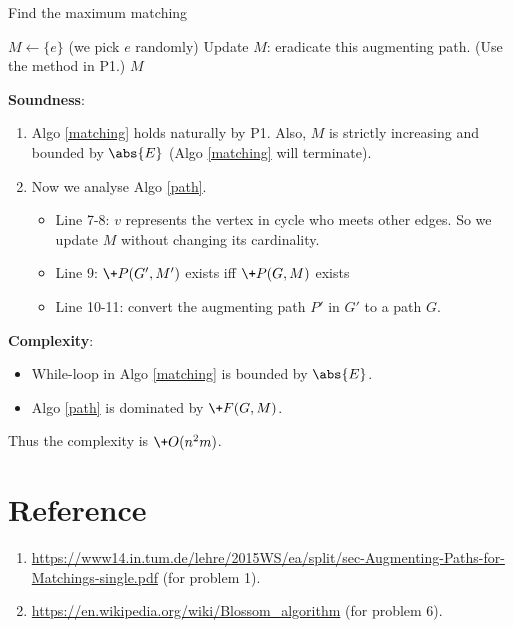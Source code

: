 \documentclass{article}
\begin{document}
\begin{algorithm}[H]
	\caption{Find the maximum matching}
	\label{matching}
	\begin{algorithmic}[1]
		\renewcommand{\algorithmicrequire}{\textbf{Input:}}
		\renewcommand{\algorithmicensure}{\textbf{Output:}}
		\renewcommand{\algorithmiccomment}[1]{\hfill\textit{\textcolor{blue}{\##1}}}
		\REQUIRE 
		\ENSURE 
		\STATE $M\gets \{e\}$ (we pick $e$ randomly)
		\STATE Update $M$: eradicate this augmenting path. (Use the method in P1.)
		\ENDWHILE
		\RETURN $M$
	\end{algorithmic}
\end{algorithm}
\textbf{Soundness}:
\begin{enumerate}
	\item 
		Algo \ref{matching} holds naturally by P1. Also, $M$ is strictly increasing and bounded by $\abs{E}$ (Algo \ref{matching} will terminate).
	\item
		Now we analyse Algo \ref{path}.
		\begin{itemize}
			\item
				Line 7-8: $v$ represents the vertex in cycle who meets other edges. So we update $M$ without changing its cardinality.
			\item
				Line 9: $\+P(G',M')$ exists iff $\+P(G,M)$ exists
			\item
				Line 10-11: convert the augmenting path  $P'$ in  $G'$ to a path $G$.
		\end{itemize}
\end{enumerate}

\vspace{1em}
\textbf{Complexity}:
\begin{itemize}
	\item 
		While-loop in Algo \ref{matching} is bounded by $\abs{E}$.
	\item
		Algo \ref{path} is dominated by $\+F(G,M)$.
\end{itemize}
Thus the complexity is $\+O(n^2m)$.

\section*{Reference}
\begin{enumerate}
	\item \url{https://www14.in.tum.de/lehre/2015WS/ea/split/sec-Augmenting-Paths-for-Matchings-single.pdf} (for problem 1).
	\item \url{https://en.wikipedia.org/wiki/Blossom_algorithm} (for problem 6).
\end{enumerate}
\end{document}
